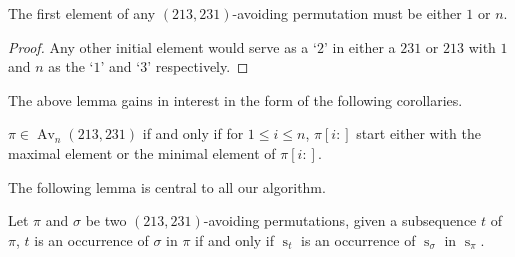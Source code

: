 \documentclass[a4paper]{llncs}
\DeclareMathOperator{\AV}{Av}
\DeclareMathOperator{\Avd}{Av}
\newcommand\Av[2]{\Avd_{{#1}}({#2})}
\newcommand{\ptext}{\pi}
\newcommand{\pmotif}{\sigma}
\DeclareMathOperator{\stripea}{s}
\newcommand{\stripe}[2]{\stripea_{{#1}}[{#2}]}
\newcommand{\stripew}[1]{\stripea_{{#1}}}
\newcommand{\dstep}{d}
\newcommand{\ustep}{a}
\begin{document}
\begin{lemma}[Folklore]
\label{lemma:first element is 1 or n}
The first element of any $(213,231)$-avoiding permutation
must be either $1$ or $n$.
\end{lemma}

\begin{proof} 
Any other initial element would serve as a `$2$' in either a 
$231$ or $213$ with $1$ and $n$ as the `$1$' and `$3$' respectively.
\end{proof}
	
The above lemma gains in interest in the form of the following corollaries.

\begin{corollary}
\label{corollary:minmaxelement}
$\pi \in \AV_n(213,231)$ if and only if for $1 \leq i \leq n$, 
$\pi[i:]$ start either with the maximal element
or the minimal element of $\pi[i:]$.
\end{corollary}

%

The following lemma is central to all our algorithm.

\begin{lemma}
\label{lemma:MatchStripeToPermutation}
Let $\pi$ and $\sigma$ be two $(213,231)$-avoiding permutations, given a subsequence $t$ of $\ptext$, $t$ is an occurrence of $\pmotif$ in $\ptext$ if and only if $\stripew{t}$ is an occurrence of $\stripew{\pmotif}$ in $\stripew{\ptext}$.
\end{lemma}	 
	 
\end{document}
